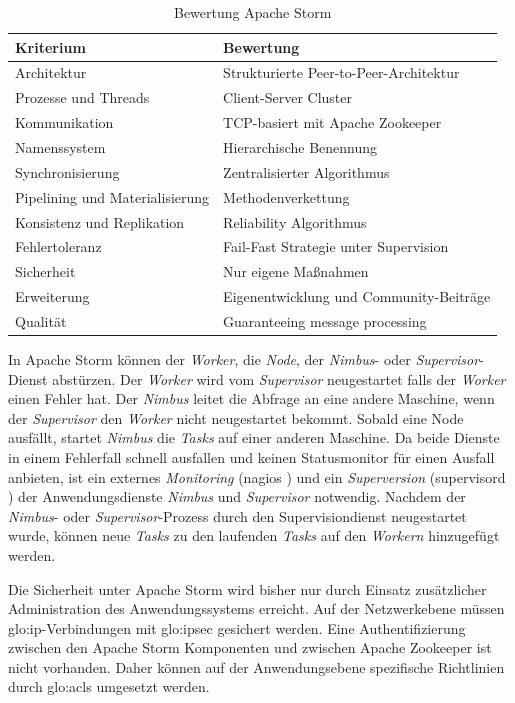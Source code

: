 \begin{table}[ht!]
	\centering
		\begin{tabular}{@{}ll@{}} \toprule
			\textbf{Kriterium} & \textbf{Bewertung} \\ \midrule
			Architektur & Strukturierte Peer-to-Peer-Architektur \\
			Prozesse und Threads & Client-Server Cluster \\
			Kommunikation & TCP-basiert mit Apache Zookeeper \\
			Namenssystem & Hierarchische Benennung \\
			Synchronisierung & Zentralisierter Algorithmus \\
			Pipelining und Materialisierung & Methodenverkettung \\
			Konsistenz und Replikation & Reliability Algorithmus \\
			Fehlertoleranz & Fail-Fast Strategie unter Supervision \\
			Sicherheit & Nur eigene Maßnahmen \\
			Erweiterung & Eigenentwicklung und Community-Beiträge \\
			Qualität & Guaranteeing message processing \\
			\bottomrule			
		\end{tabular}
	\caption{Bewertung Apache Storm}
	\label{tab:bewstorm}
\end{table}

In Apache Storm können der \textit{Worker}, die \textit{Node}, der \textit{Nimbus}- oder \textit{Supervisor}-Dienst abstürzen. Der \textit{Worker} wird vom \textit{Supervisor} neugestartet falls der \textit{Worker} einen Fehler hat. Der \textit{Nimbus} leitet die Abfrage an eine andere Maschine, wenn der \textit{Supervisor} den \textit{Worker} nicht neugestartet bekommt. Sobald eine Node ausfällt, startet \textit{Nimbus} die \textit{Tasks} auf einer anderen Maschine. Da beide Dienste in einem Fehlerfall schnell ausfallen und keinen Statusmonitor für einen Ausfall anbieten, ist ein externes \textit{Monitoring} (nagios ) und ein \textit{Superversion} (supervisord ) der Anwendungsdienste \textit{Nimbus} und \textit{Supervisor} notwendig. Nachdem der \textit{Nimbus}- oder \textit{Supervisor}-Prozess durch den Supervisiondienst neugestartet wurde, können neue \textit{Tasks} zu den laufenden \textit{Tasks} auf den \textit{Workern} hinzugefügt werden. 

Die Sicherheit unter Apache Storm wird bisher nur durch Einsatz zusätzlicher Administration des Anwendungssystems erreicht. Auf der Netzwerkebene müssen \gls{glo:ip}-Verbindungen mit \gls{glo:ipsec} gesichert werden. Eine Authentifizierung zwischen den Apache Storm Komponenten und zwischen Apache Zookeeper ist nicht vorhanden. Daher können auf der Anwendungsebene spezifische Richtlinien durch \glspl{glo:acl} umgesetzt werden. 

